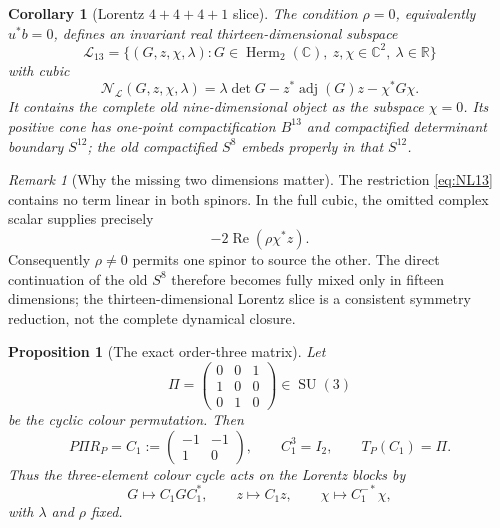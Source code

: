 \documentclass[11pt]{article}
\newtheorem{proposition}[theorem]{Proposition}
\newtheorem{corollary}[theorem]{Corollary}
\theoremstyle{definition}
\theoremstyle{remark}
\newtheorem{remark}[theorem]{Remark}
\newcommand{\R}{\mathbb R}
\newcommand{\C}{\mathbb C}
\newcommand{\Herm}{\operatorname{Herm}}
\newcommand{\adj}{\operatorname{adj}}
\newcommand{\Ree}{\operatorname{Re}}
\newcommand{\SU}{\operatorname{SU}}
\newcommand{\cL}{\mathcal L}
\newcommand{\cN}{\mathcal N}
\begin{document}
\begin{corollary}[Lorentz $4+4+4+1$ slice]\label{cor:L13}
The condition $\rho=0$, equivalently $u^*b=0$, defines an invariant real thirteen-dimensional subspace
\begin{equation}\label{eq:L13}
 \cL_{13}
 =\{(G,z,\chi,\lambda):G\in\Herm_2(\C),\ z,\chi\in\C^2,\ \lambda\in\R\}
\end{equation}
with cubic
\begin{equation}\label{eq:NL13}
 \boxed{
 \cN_{\cL}(G,z,\chi,\lambda)
 =\lambda\det G-z^*\adj(G)z-\chi^*G\chi.}
\end{equation}
It contains the complete old nine-dimensional object as the subspace $\chi=0$.  Its positive cone has one-point compactification $B^{13}$ and compactified determinant boundary $S^{12}$; the old compactified $S^8$ embeds properly in that $S^{12}$.
\end{corollary}

\begin{remark}[Why the missing two dimensions matter]
The restriction \eqref{eq:NL13} contains no term linear in both spinors.  In the full cubic, the omitted complex scalar supplies precisely
\[
 -2\Ree(\rho\chi^*z).
\]
Consequently $\rho\neq0$ permits one spinor to source the other.  The direct continuation of the old $S^8$ therefore becomes fully mixed only in fifteen dimensions; the thirteen-dimensional Lorentz slice is a consistent symmetry reduction, not the complete dynamical closure.
\end{remark}

\begin{proposition}[The exact order-three matrix]\label{prop:C3}
Let
\[
 \Pi=\begin{pmatrix}0&0&1\\1&0&0\\0&1&0\end{pmatrix}\in\SU(3)
\]
be the cyclic colour permutation.  Then
\begin{equation}\label{eq:C1}
 P\Pi R_P=
 C_1:=\begin{pmatrix}-1&-1\\1&0\end{pmatrix},
 \qquad C_1^3=I_2,
 \qquad T_P(C_1)=\Pi.
\end{equation}
Thus the three-element colour cycle acts on the Lorentz blocks by
\[
 G\mapsto C_1GC_1^*,\qquad
 z\mapsto C_1z,\qquad
 \chi\mapsto C_1^{-*}\chi,
\]
with $\lambda$ and $\rho$ fixed.
\end{proposition}
\end{document}
